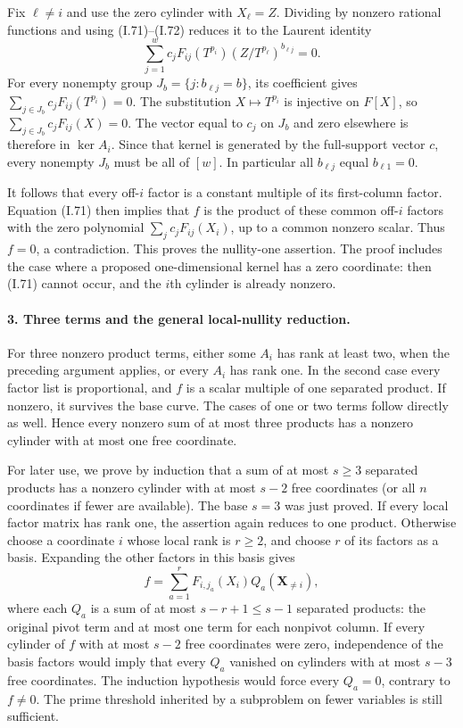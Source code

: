 Fix $\ell\ne i$ and use the zero cylinder with $X_\ell=Z$.
Dividing by nonzero rational functions and using (I.71)--(I.72)
reduces it to the Laurent identity
\[
 \sum_{j=1}^w c_j F_{ij}(T^{p_i})
       (Z/T^{p_\ell})^{b_{\ell j}}=0.
 \tag{I.73}
\]
For every nonempty group $J_b=\{j:b_{\ell j}=b\}$, its
coefficient gives
$\sum_{j\in J_b}c_jF_{ij}(T^{p_i})=0$.
The substitution $X\mapsto T^{p_i}$ is injective on $F[X]$,
so $\sum_{j\in J_b}c_jF_{ij}(X)=0$.
The vector equal to $c_j$ on $J_b$ and zero elsewhere is
therefore in $\ker A_i$. Since that kernel is generated by
the full-support vector $c$, every nonempty $J_b$ must be
all of $[w]$. In particular all $b_{\ell j}$ equal
$b_{\ell1}=0$.

It follows that every off-$i$ factor is a constant multiple
of its first-column factor. Equation (I.71) then implies that
$f$ is the product of these common off-$i$ factors with the
zero polynomial $\sum_jc_jF_{ij}(X_i)$, up to a common
nonzero scalar. Thus $f=0$, a contradiction. This proves
the nullity-one assertion. The proof includes the case where
a proposed one-dimensional kernel has a zero coordinate:
then (I.71) cannot occur, and the $i$th cylinder is already
nonzero.

\paragraph{3. Three terms and the general local-nullity reduction.}
For three nonzero product terms, either some $A_i$ has rank
at least two, when the preceding argument applies, or every
$A_i$ has rank one. In the second case every factor list is
proportional, and $f$ is a scalar multiple of one separated
product. If nonzero, it survives the base curve. The cases
of one or two terms follow directly as well. Hence every
nonzero sum of at most three products has a nonzero cylinder
with at most one free coordinate.

For later use, we prove by induction that a sum of at most
$s\ge3$ separated products has a nonzero cylinder with at
most $s-2$ free coordinates (or all $n$ coordinates if fewer
are available). The base $s=3$ was just proved. If every
local factor matrix has rank one, the assertion again
reduces to one product. Otherwise choose a coordinate $i$
whose local rank is $r\ge2$, and choose $r$ of its factors
as a basis. Expanding the other factors in this basis gives
\[
 f=\sum_{a=1}^r F_{i,j_a}(X_i)Q_a(\mathbf X_{\ne i}),
 \tag{I.74}
\]
where each $Q_a$ is a sum of at most $s-r+1\le s-1$
separated products: the original pivot term and at most one
term for each nonpivot column. If every cylinder of $f$
with at most $s-2$ free coordinates were zero, independence
of the basis factors would imply that every $Q_a$ vanished
on cylinders with at most $s-3$ free coordinates. The
induction hypothesis would force every $Q_a=0$, contrary
to $f\ne0$. The prime threshold inherited by a subproblem
on fewer variables is still sufficient.

